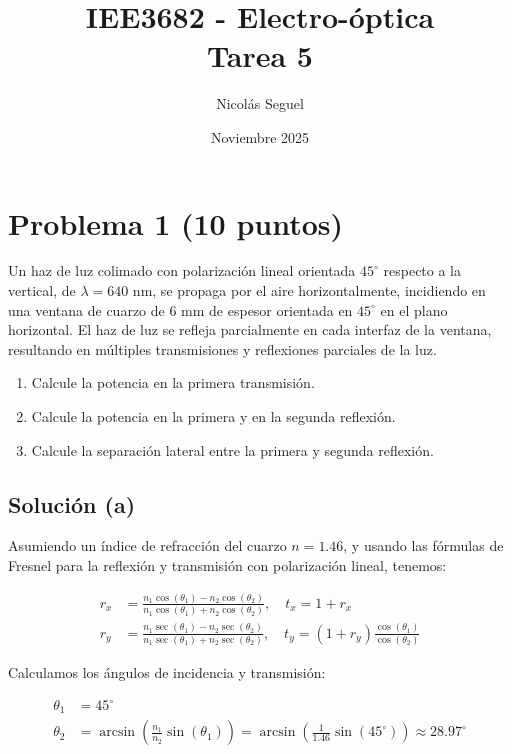 \documentclass[11pt]{article}
\title{IEE3682 - Electro-óptica \\ Tarea 5}
\author{Nicolás Seguel}
\date{Noviembre 2025}
\begin{document}
\maketitle

\section*{Problema 1 (10 puntos)}

Un haz de luz colimado con polarización lineal orientada $45^\circ$ respecto a la vertical, de 
$\lambda = 640$ nm, se propaga por el aire horizontalmente, incidiendo en una ventana de cuarzo 
de 6 mm de espesor orientada en $45^\circ$ en el plano horizontal. El haz de luz se refleja parcialmente 
en cada interfaz de la ventana, resultando en múltiples transmisiones y reflexiones parciales de la luz.

\begin{enumerate}
    \item[(a)] Calcule la potencia en la primera transmisión.
    \item[(b)] Calcule la potencia en la primera y en la segunda reflexión.
    \item[(c)] Calcule la separación lateral entre la primera y segunda reflexión.
\end{enumerate}

\subsection*{Solución (a)}

Asumiendo un índice de refracción del cuarzo $n = 1.46$, y usando las fórmulas de Fresnel para la reflexión y transmisión con polarización lineal, tenemos:

\begin{align*}
    r_x &= \frac{n_1 \cos(\theta_1) - n_2 \cos(\theta_2)}{n_1 \cos(\theta_1) + n_2 \cos(\theta_2)}, \quad t_x = 1 + r_x \\
    r_y &= \frac{n_1 \sec(\theta_1) - n_2 \sec(\theta_2)}{n_1 \sec(\theta_1) + n_2 \sec(\theta_2)}, \quad t_y = (1 + r_y) \frac{\cos(\theta_1)}{\cos(\theta_2)}
\end{align*}

Calculamos los ángulos de incidencia y transmisión:

\begin{align*}
    \theta_1 &= 45^\circ \\
    \theta_2 &= \arcsin\left(\frac{n_1}{n_2} \sin(\theta_1)\right) = \arcsin\left(\frac{1}{1.46} \sin(45^\circ)\right) \approx 28.97^\circ
\end{align*}
\end{document}
